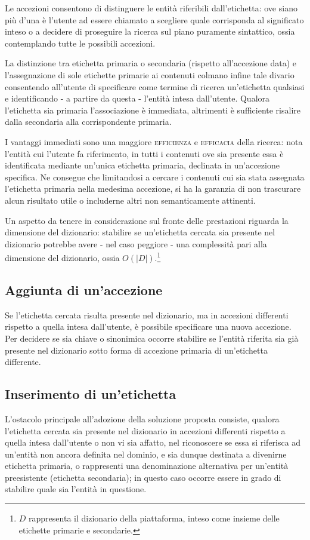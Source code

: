 \documentclass[10pt,a4paper,headinclude,footinclude,hidelinks]{scrreprt} %
\begin{document}
	Le accezioni consentono di distinguere le entità riferibili dall'etichetta: ove siano più d'una è l'utente ad essere chiamato a scegliere quale corrisponda al significato inteso o a decidere di proseguire la ricerca sul piano puramente sintattico, ossia contemplando tutte le possibili accezioni.

	La distinzione tra etichetta primaria o secondaria (rispetto all'accezione data) e l'assegnazione di sole etichette primarie ai contenuti colmano infine tale divario consentendo all'utente di specificare come termine di ricerca un'etichetta qualsiasi e identificando - a partire da questa - l'entità intesa dall'utente. Qualora l'etichetta sia primaria l'associazione è immediata, altrimenti è sufficiente risalire dalla secondaria alla corrispondente primaria.

	I vantaggi immediati sono una maggiore \textsc{efficienza} e \textsc{efficacia} della ricerca: nota l'entità cui l'utente fa riferimento, in tutti i contenuti ove sia presente essa è identificata mediante un'unica etichetta primaria, declinata in un'accezione specifica. Ne consegue che limitandosi a cercare i contenuti cui sia stata assegnata l'etichetta primaria nella medesima accezione, si ha la garanzia di non trascurare alcun risultato utile o includerne altri non semanticamente attinenti.

	Un aspetto da tenere in considerazione sul fronte delle prestazioni riguarda la dimensione del dizionario: stabilire se un'etichetta cercata sia presente nel dizionario potrebbe avere - nel caso peggiore - una complessità pari alla dimensione del dizionario, ossia $O(\left|D\right|)$.\footnote{$D$ rappresenta il dizionario della piattaforma, inteso come insieme delle etichette primarie e secondarie.}

	\subsection{Aggiunta di un'accezione}
	Se l'etichetta cercata risulta presente nel dizionario, ma in accezioni differenti rispetto a quella intesa dall'utente, è possibile specificare una nuova accezione. Per decidere se sia chiave o sinonimica occorre stabilire se l'entità riferita sia già presente nel dizionario sotto forma di accezione primaria di un'etichetta differente.

	\subsection{Inserimento di un'etichetta}
	L'ostacolo principale all'adozione della soluzione proposta consiste, qualora l'etichetta cercata sia presente nel dizionario in accezioni differenti rispetto a quella intesa dall'utente o non vi sia affatto, nel riconoscere se essa si riferisca ad un'entità non ancora definita nel dominio, e sia dunque destinata a divenirne etichetta primaria, o rappresenti una denominazione alternativa per un'entità preesistente (etichetta secondaria); in questo caso occorre essere in grado di stabilire quale sia l'entità in questione.
\end{document}
